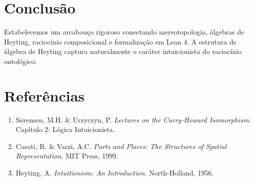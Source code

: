 \documentclass[12pt,a4paper]{article}
\theoremstyle{definition}
\theoremstyle{plain}
\theoremstyle{remark}
\begin{document}
\section{Conclusão}

Estabelecemos um arcabouço rigoroso conectando mereotopologia, álgebras de Heyting, raciocínio composicional e formalização em Lean 4. A estrutura de álgebra de Heyting captura naturalmente o caráter intuicionista do raciocínio ontológico.

\section*{Referências}

\begin{enumerate}
  \item Sørensen, M.H. \& Urzyczyn, P. \textit{Lectures on the Curry-Howard Isomorphism}. Capítulo 2: Lógica Intuicionista.
  \item Casati, R. \& Varzi, A.C. \textit{Parts and Places: The Structures of Spatial Representation}. MIT Press, 1999.
  \item Heyting, A. \textit{Intuitionism: An Introduction}. North-Holland, 1956.
\end{enumerate}
\end{document}
